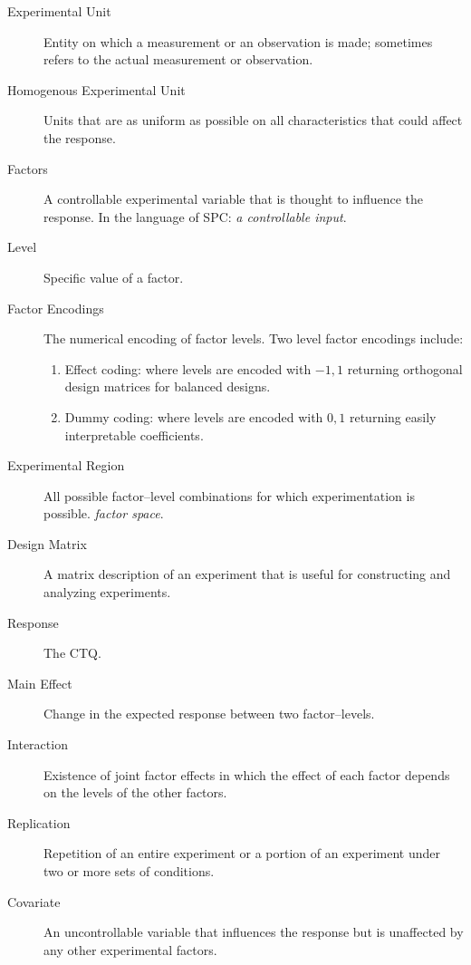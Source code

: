 \begin{description}

\item [Experimental Unit]  Entity on which a measurement or an observation is made;
sometimes refers to the actual measurement or observation.
\item [Homogenous Experimental Unit] Units that are as uniform as possible on all characteristics that could affect the response.

\item [Factors]  A controllable experimental variable that is thought to influence the response. In the language of SPC: \emph{a controllable input}.

\item [Level] Specific value of a factor.

\item [Factor Encodings] The numerical encoding of factor levels.
Two level factor encodings include:
\begin{enumerate}
\item Effect coding: where levels are encoded with $-1,1$ returning orthogonal design matrices for balanced designs.
\item Dummy coding: where levels are encoded with $0,1$ returning easily interpretable coefficients.
\end{enumerate}

\item [Experimental Region] All possible factor–level combinations for which experimentation is possible. \Aka \emph{factor space}.

\item [Design Matrix] A matrix description of an experiment that is useful for constructing and analyzing experiments.

\item [Response] The CTQ.

\item [Main Effect] Change in the expected response between two factor–levels.  

\item [Interaction] Existence of joint factor effects in which the effect of each factor depends on the levels of the other factors.

\item [Replication] Repetition of an entire experiment or a portion of an experiment
under two or more sets of conditions.

\item [Covariate]  An uncontrollable variable that influences the response but is
unaffected by any other experimental factors.


\end{description}
